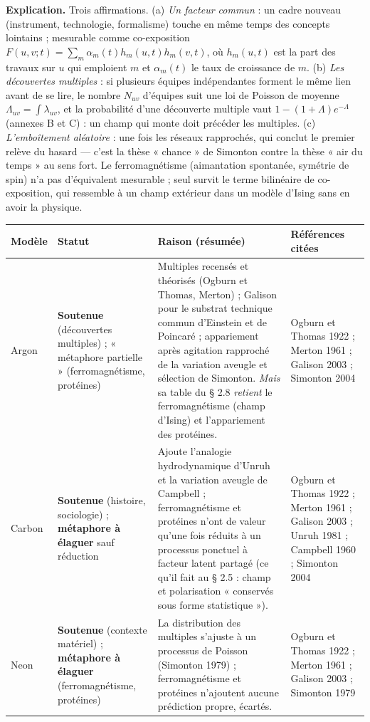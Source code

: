 \documentclass[a4paper,11pt]{article}
\makeatletter
\newenvironment{avis}{\small\renewcommand{\arraystretch}{1.15}%
\begin{longtable}{@{}>{\raggedright\arraybackslash}p{1.35cm}>{\raggedright\arraybackslash}p{2.45cm}>{\raggedright\arraybackslash}p{7.15cm}>{\raggedright\arraybackslash}p{4.4cm}@{}}
\toprule \textbf{Modèle} & \textbf{Statut} & \textbf{Raison (résumée)} & \textbf{Références citées}\\ \midrule \endhead
\bottomrule \endfoot}{\end{longtable}}
\newcommand{\st}[1]{\textbf{#1}}
\makeatother
\begin{document}
\textbf{Explication.} Trois affirmations. (a) \emph{Un facteur commun} : un cadre nouveau (instrument, technologie, formalisme) touche en même temps des concepts lointains ; mesurable comme co-exposition $F(u,v;t)=\sum_m\alpha_m(t)h_m(u,t)h_m(v,t)$, où $h_m(u,t)$ est la part des travaux sur $u$ qui emploient $m$ et $\alpha_m(t)$ le taux de croissance de $m$. (b) \emph{Les découvertes multiples} : si plusieurs équipes indépendantes forment le même lien avant de se lire, le nombre $N_{uv}$ d'équipes suit une loi de Poisson de moyenne $\Lambda_{uv}=\int\lambda_{uv}$, et la probabilité d'une découverte multiple vaut $1-(1+\Lambda)e^{-\Lambda}$ (annexes B et C) : un champ qui monte doit précéder les multiples. (c) \emph{L'emboîtement aléatoire} : une fois les réseaux rapprochés, qui conclut le premier relève du hasard — c'est la thèse « chance » de Simonton contre la thèse « air du temps » au sens fort. Le ferromagnétisme (aimantation spontanée, symétrie de spin) n'a pas d'équivalent mesurable ; seul survit le terme bilinéaire de co-exposition, qui ressemble à un champ extérieur dans un modèle d'Ising sans en avoir la physique.

\begin{avis}
Argon & \st{Soutenue} (découvertes multiples) ; « métaphore partielle » (ferromagnétisme, protéines) & Multiples recensés et théorisés (Ogburn et Thomas, Merton) ; Galison pour le substrat technique commun d'Einstein et de Poincaré ; appariement après agitation rapproché de la variation aveugle et sélection de Simonton. \emph{Mais} sa table du § 2.8 \emph{retient} le ferromagnétisme (champ d'Ising) et l'appariement des protéines. & Ogburn et Thomas 1922 ; Merton 1961 ; Galison 2003 ; Simonton 2004\\ \midrule
Carbon & \st{Soutenue} (histoire, sociologie) ; \st{métaphore à élaguer} sauf réduction & Ajoute l'analogie hydrodynamique d'Unruh et la variation aveugle de Campbell ; ferromagnétisme et protéines n'ont de valeur qu'une fois réduits à un processus ponctuel à facteur latent partagé (ce qu'il fait au § 2.5 : champ et polarisation « conservés sous forme statistique »). & Ogburn et Thomas 1922 ; Merton 1961 ; Galison 2003 ; Unruh 1981 ; Campbell 1960 ; Simonton 2004\\ \midrule
Neon & \st{Soutenue} (contexte matériel) ; \st{métaphore à élaguer} (ferromagnétisme, protéines) & La distribution des multiples s'ajuste à un processus de Poisson (Simonton 1979) ; ferromagnétisme et protéines n'ajoutent aucune prédiction propre, écartés. & Ogburn et Thomas 1922 ; Merton 1961 ; Galison 2003 ; Simonton 1979\\
\end{avis}
\end{document}
